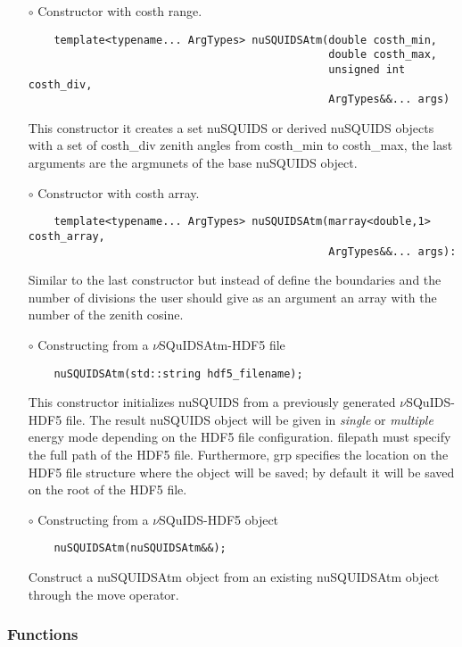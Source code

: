 \begin{itemize}
\item[$\circ$] Constructor with {\ttf costh} range.
  \begin{lstlisting}
    template<typename... ArgTypes> nuSQUIDSAtm(double costh_min, 
                                               double costh_max,
                                               unsigned int costh_div, 
                                               ArgTypes&&... args)
  \end{lstlisting}
This constructor it creates a set {\ttf nuSQUIDS} or derived {\ttf
  nuSQUIDS} objects with a set of
{\ttf costh\_div} zenith angles from {\ttf costh\_min} to {\ttf
  costh\_max}, the last arguments are the argmunets of the base {\ttf
  nuSQUIDS} object.

\item[$\circ$] Constructor with {\ttf costh} array.
  \begin{lstlisting}
    template<typename... ArgTypes> nuSQUIDSAtm(marray<double,1> costh_array,
                                               ArgTypes&&... args):
  \end{lstlisting}
Similar to the last constructor but instead of define the boundaries
and the number of divisions the user should give as an argument an
array with the number of the zenith cosine.
\item[$\circ$] Constructing from a $\nu$SQuIDSAtm-HDF5 file
  \begin{lstlisting}
    nuSQUIDSAtm(std::string hdf5_filename);
  \end{lstlisting}
This constructor initializes {\ttfamily nuSQUIDS} from a 
previously generated $\nu$SQuIDS-HDF5 file. The result {\ttfamily nuSQUIDS} 
object will be given in {\it single} or {\it multiple} energy mode
depending on the HDF5 file configuration. {\ttfamily filepath} must specify the full
path of the HDF5 file. Furthermore,
{\ttfamily grp} specifies the location on the HDF5 file structure
where the object will be saved; by default
it will be saved on the {\ttfamily root} of the HDF5 file.
\item[$\circ$] Constructing from a $\nu$SQuIDS-HDF5 object
  \begin{lstlisting}
    nuSQUIDSAtm(nuSQUIDSAtm&&);
  \end{lstlisting}
Construct a {\ttfamily nuSQUIDSAtm} object from an existing {\ttfamily
  nuSQUIDSAtm} object through the {\ttfamily move} operator.

\end{itemize}


\subsubsection{Functions}
